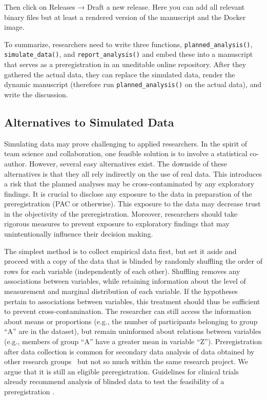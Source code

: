 \documentclass[psych,tutorial,accept,moreauthors,pdftex]{Definitions/mdpi}
\begin{document}
\begin{paracol}{2}
Then click on Releases → Draft a new release. Here you can add all
relevant binary files but at least a rendered version of the manuscript
and the Docker image.

To summarize, researchers need to write three functions,
\texttt{planned\_analysis()}, \\ \texttt{simulate\_data()}, and
\texttt{report\_analysis()} and embed these into a manuscript that
serves as a preregistration in an uneditable online repository. After
they gathered the actual data, they can replace the simulated data,
render the dynamic manuscript (therefore run
\texttt{planned\_analysis()} on the actual data), and write the
discussion.

\subsection{Alternatives to Simulated
Data}\label{alternatives-to-simulated-data}

Simulating data may prove challenging to applied researchers. In the
spirit of team science and collaboration, one feasible solution is to
involve a statistical co-author. However, several easy alternatives
exist. The downside of these alternatives is that they all rely
indirectly on the use of real data. This introduces a risk that the
planned analyses may be cross-contaminated by any exploratory findings.
It is crucial to disclose any exposure to the data in preparation of the
preregistration (PAC or otherwise). This exposure to the data may
decrease trust in the objectivity of the preregistration. Moreover,
researchers should take rigorous measures to prevent exposure to
exploratory findings that may unintentionally influence their decision
making.

The simplest method is to collect empirical data first, but set it aside
and proceed with a copy of the data that is blinded by randomly
shuffling the order of rows for each variable (independently of each
other). Shuffling removes any associations between variables, while
retaining information about the level of measurement and marginal
distribution of each variable. If the hypotheses pertain to associations
between variables, this treatment should thus be sufficient to prevent
cross-contamination. The researcher can still access the information
about means or proportions (e.g., the number of participants belonging
to group ``A'' are in the dataset), but remain uninformed about
relations between variables (e.g., members of group ``A'' have a greater
mean in variable ``Z''). Preregistration after data collection is common
for secondary data analysis of data obtained by other research groups~\citep{westonRecommendationsIncreasingTransparency2019} but not so much
within the same research project. We argue that it is still an eligible
preregistration. Guidelines for clinical trials already recommend
analysis of blinded data to test the feasibility of a preregistration
\citep{ICH1998}.


\end{paracol}
\end{document}
